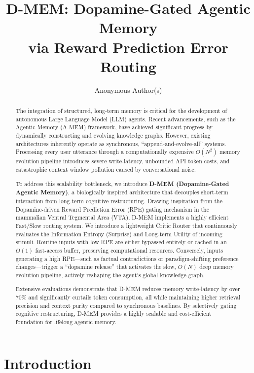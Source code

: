 \documentclass{article}
\title{D-MEM: Dopamine-Gated Agentic Memory \\ via Reward Prediction Error Routing}
\author{
  Anonymous Author(s)
}
\begin{document}
\maketitle

\begin{abstract}
The integration of structured, long-term memory is critical for the development of autonomous Large Language Model (LLM) agents. Recent advancements, such as the Agentic Memory (A-MEM) framework, have achieved significant progress by dynamically constructing and evolving knowledge graphs. However, existing architectures inherently operate as synchronous, ``append-and-evolve-all'' systems. Processing every user utterance through a computationally expensive $O(N^2)$ memory evolution pipeline introduces severe write-latency, unbounded API token costs, and catastrophic context window pollution caused by conversational noise.

To address this scalability bottleneck, we introduce \textbf{D-MEM (Dopamine-Gated Agentic Memory)}, a biologically inspired architecture that decouples short-term interaction from long-term cognitive restructuring. Drawing inspiration from the Dopamine-driven Reward Prediction Error (RPE) gating mechanism in the mammalian Ventral Tegmental Area (VTA), D-MEM implements a highly efficient Fast/Slow routing system. We introduce a lightweight Critic Router that continuously evaluates the Information Entropy (Surprise) and Long-term Utility of incoming stimuli. Routine inputs with low RPE are either bypassed entirely or cached in an $O(1)$ fast-access buffer, preserving computational resources. Conversely, inputs generating a high RPE---such as factual contradictions or paradigm-shifting preference changes---trigger a ``dopamine release'' that activates the slow, $O(N)$ deep memory evolution pipeline, actively reshaping the agent's global knowledge graph. 

Extensive evaluations demonstrate that D-MEM reduces memory write-latency by over 70\% and significantly curtails token consumption, all while maintaining higher retrieval precision and context purity compared to synchronous baselines. By selectively gating cognitive restructuring, D-MEM provides a highly scalable and cost-efficient foundation for lifelong agentic memory.
\end{abstract}

\section{Introduction}
\end{document}
